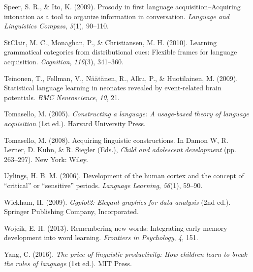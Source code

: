 \documentclass[man,mask,floatsintext]{apa6}
\theoremstyle{definition}
\theoremstyle{definition}
\theoremstyle{definition}
\theoremstyle{remark}
\begin{document}
\hypertarget{ref-speer2009prosody}{}
Speer, S. R., \& Ito, K. (2009). Prosody in first language
acquisition--Acquiring intonation as a tool to organize information in
conversation. \emph{Language and Linguistics Compass}, \emph{3}(1),
90--110.

\hypertarget{ref-clair2010learning}{}
StClair, M. C., Monaghan, P., \& Christiansen, M. H. (2010). Learning
grammatical categories from distributional cues: Flexible frames for
language acquisition. \emph{Cognition}, \emph{116}(3), 341--360.

\hypertarget{ref-teinonen2009statistical}{}
Teinonen, T., Fellman, V., Näätänen, R., Alku, P., \& Huotilainen, M.
(2009). Statistical language learning in neonates revealed by
event-related brain potentials. \emph{BMC Neuroscience}, \emph{10}, 21.

\hypertarget{ref-tomasello2003constructing}{}
Tomasello, M. (2005). \emph{Constructing a language: A usage-based
theory of language acquisition} (1st ed.). Harvard University Press.

\hypertarget{ref-tomasello2006acquiring}{}
Tomasello, M. (2008). Acquiring linguistic constructions. In Damon W, R.
Lerner, D. Kuhn, \& R. Siegler (Eds.), \emph{Child and adolescent
development} (pp. 263--297). New York: Wiley.

\hypertarget{ref-uylings2006development}{}
Uylings, H. B. M. (2006). Development of the human cortex and the
concept of ``critical'' or ``sensitive'' periods. \emph{Language
Learning}, \emph{56}(1), 59--90.

\hypertarget{ref-ggplot2}{}
Wickham, H. (2009). \emph{Ggplot2: Elegant graphics for data analysis}
(2nd ed.). Springer Publishing Company, Incorporated.

\hypertarget{ref-wojcik2013remembering}{}
Wojcik, E. H. (2013). Remembering new words: Integrating early memory
development into word learning. \emph{Frontiers in Psychology},
\emph{4}, 151.

\hypertarget{ref-yang2016price}{}
Yang, C. (2016). \emph{The price of linguistic productivity: How
children learn to break the rules of language} (1st ed.). MIT Press.

\endgroup
\end{document}
